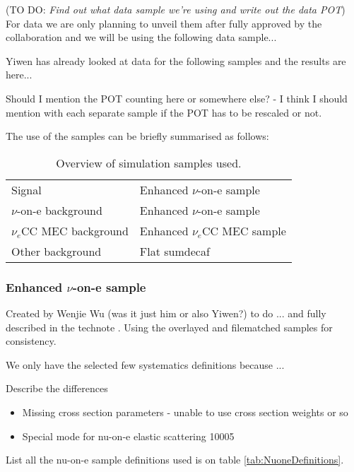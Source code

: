\documentclass[12pt]{article}
\newcommand{\todo }[1]{({\color{red}\sc TO DO: \textit{#1}})}
\begin{document}
\todo{Find out what data sample we're using and write out the data POT}
For data we are only planning to unveil them after fully approved by the collaboration and we will be using the following data sample...

Yiwen has already looked at data for the following samples and the results are here...

Should I mention the POT counting here or somewhere else? - I think I should mention with each separate sample if the POT has to be rescaled or not.

The use of the samples can be briefly summarised as follows:
\begin{table}[!ht]
\centering
\def\arraystretch{1.4}
\begin{tabular}{l@{\hskip 1in}l}
Signal                   & Enhanced $\nu$-on-e sample\\
$\nu$-on-e background    & Enhanced $\nu$-on-e sample\\
$\nu_e$CC MEC background & Enhanced $\nu_e$CC MEC sample\\
Other background         & Flat sumdecaf
\end{tabular}
\caption{Overview of simulation samples used.}
\label{tab:DefinitionsOverview}
\end{table}

\subsubsection*{Enhanced $\nu$-on-e sample}
Created by Wenjie Wu (was it just him or also Yiwen?) to do ... and fully described in the technote \cite{NOVA-doc-56383}. Using the overlayed and filematched samples for consistency.

We only have the selected few systematics definitions because ... 

Describe the differences
\begin{itemize}
\item Missing cross section parameters - unable to use cross section weights or so
\item Special mode for nu-on-e elastic scattering 10005
\end{itemize}

List all the nu-on-e sample definitions used is on table \ref{tab:NuoneDefinitions}.
\end{document}
